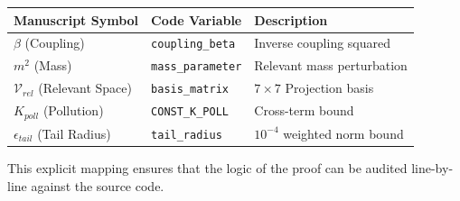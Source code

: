 \begin{center}
\begin{tabular}{|l|l|l|}
\hline
\textbf{Manuscript Symbol} & \textbf{Code Variable} & \textbf{Description} \\ \hline
$\beta$ (Coupling) & \texttt{coupling\_beta} & Inverse coupling squared \\
$m^2$ (Mass) & \texttt{mass\_parameter} & Relevant mass perturbation \\
$\mathcal{V}_{rel}$ (Relevant Space) & \texttt{basis\_matrix} & $7 \times 7$ Projection basis \\
$K_{poll}$ (Pollution) & \texttt{CONST\_K\_POLL} & Cross-term bound \\
$\epsilon_{tail}$ (Tail Radius) & \texttt{tail\_radius} & $10^{-4}$ weighted norm bound \\
\hline
\end{tabular}
\end{center}

This explicit mapping ensures that the logic of the proof can be audited line-by-line against the source code.

